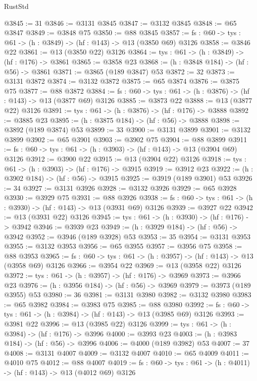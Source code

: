\begin{lexlean}{RustStd}
\begin{coremodule}
@3845 := 31
@3846 := @3131 @3845
@3847 := @3132 @3845
@3848 := @65 @3847
@3849 := @3848 @75
@3850 := @88 @3845
@3857 := {fs : @60} -> {tys : @61} -> (h : @3849) -> (hf : @143) -> @13 (@3850 @69) @3126
@3858 := @3846 @22
@3861 := @13 (@3850 @22) @3126
@3864 := {tys : @61} -> (h : @3849) -> (hf : @176) -> @3861
@3865 := @3858 @23
@3868 := (h : @3848 @184) -> (hf : @56) -> @3861
@3871 := @3865 (@189 @3847) @53
@3872 := 32
@3873 := @3131 @3872
@3874 := @3132 @3872
@3875 := @65 @3874
@3876 := @3875 @75
@3877 := @88 @3872
@3884 := {fs : @60} -> {tys : @61} -> (h : @3876) -> (hf : @143) -> @13 (@3877 @69) @3126
@3885 := @3873 @22
@3888 := @13 (@3877 @22) @3126
@3891 := {tys : @61} -> (h : @3876) -> (hf : @176) -> @3888
@3892 := @3885 @23
@3895 := (h : @3875 @184) -> (hf : @56) -> @3888
@3898 := @3892 (@189 @3874) @53
@3899 := 33
@3900 := @3131 @3899
@3901 := @3132 @3899
@3902 := @65 @3901
@3903 := @3902 @75
@3904 := @88 @3899
@3911 := {fs : @60} -> {tys : @61} -> (h : @3903) -> (hf : @143) -> @13 (@3904 @69) @3126
@3912 := @3900 @22
@3915 := @13 (@3904 @22) @3126
@3918 := {tys : @61} -> (h : @3903) -> (hf : @176) -> @3915
@3919 := @3912 @23
@3922 := (h : @3902 @184) -> (hf : @56) -> @3915
@3925 := @3919 (@189 @3901) @53
@3926 := 34
@3927 := @3131 @3926
@3928 := @3132 @3926
@3929 := @65 @3928
@3930 := @3929 @75
@3931 := @88 @3926
@3938 := {fs : @60} -> {tys : @61} -> (h : @3930) -> (hf : @143) -> @13 (@3931 @69) @3126
@3939 := @3927 @22
@3942 := @13 (@3931 @22) @3126
@3945 := {tys : @61} -> (h : @3930) -> (hf : @176) -> @3942
@3946 := @3939 @23
@3949 := (h : @3929 @184) -> (hf : @56) -> @3942
@3952 := @3946 (@189 @3928) @53
@3953 := 35
@3954 := @3131 @3953
@3955 := @3132 @3953
@3956 := @65 @3955
@3957 := @3956 @75
@3958 := @88 @3953
@3965 := {fs : @60} -> {tys : @61} -> (h : @3957) -> (hf : @143) -> @13 (@3958 @69) @3126
@3966 := @3954 @22
@3969 := @13 (@3958 @22) @3126
@3972 := {tys : @61} -> (h : @3957) -> (hf : @176) -> @3969
@3973 := @3966 @23
@3976 := (h : @3956 @184) -> (hf : @56) -> @3969
@3979 := @3973 (@189 @3955) @53
@3980 := 36
@3981 := @3131 @3980
@3982 := @3132 @3980
@3983 := @65 @3982
@3984 := @3983 @75
@3985 := @88 @3980
@3992 := {fs : @60} -> {tys : @61} -> (h : @3984) -> (hf : @143) -> @13 (@3985 @69) @3126
@3993 := @3981 @22
@3996 := @13 (@3985 @22) @3126
@3999 := {tys : @61} -> (h : @3984) -> (hf : @176) -> @3996
@4000 := @3993 @23
@4003 := (h : @3983 @184) -> (hf : @56) -> @3996
@4006 := @4000 (@189 @3982) @53
@4007 := 37
@4008 := @3131 @4007
@4009 := @3132 @4007
@4010 := @65 @4009
@4011 := @4010 @75
@4012 := @88 @4007
@4019 := {fs : @60} -> {tys : @61} -> (h : @4011) -> (hf : @143) -> @13 (@4012 @69) @3126

\end{coremodule}
\end{lexlean}
